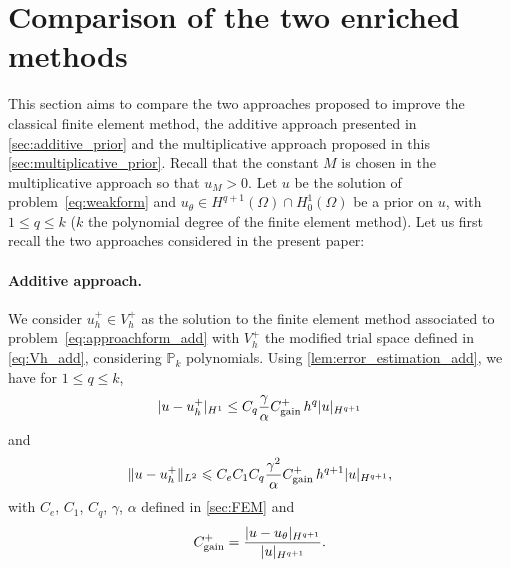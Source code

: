 \section{Comparison of the two enriched methods}
\label{sec:comparison_add_mul}

This section aims to compare the two approaches proposed to improve the classical finite element method, the additive approach presented in \cref{sec:additive_prior} and the multiplicative approach proposed in this \cref{sec:multiplicative_prior}. Recall that the constant $M$ is chosen in the multiplicative approach so that $u_M>0$.
Let $u$ be the solution of problem~\eqref{eq:weakform} and $u_{\theta}\in H^{q+1}(\Omega)\cap H^1_0(\Omega)$ be a prior on $u$, with $1\le q\le k$ ($k$ the polynomial degree of the finite element method). Let us first recall the two approaches considered in the present paper:

\paragraph*{Additive approach.} We consider $u_h^+\in V_h^+$ as the solution to the finite element method associated to problem~\eqref{eq:approachform_add} with $V_h^+$ the modified trial space defined in \eqref{eq:Vh_add}, considering $\mathbb{P}_k$ polynomials. Using \cref{lem:error_estimation_add}, we have for $1\le q\le k$,
\begin{equation}
	\label{eq:error_add_comp}
	| u-u_h^+|_{H^1} \leq C_q\dfrac{\gamma}{\alpha} C_\text{\rm gain}^+ \, h^{q} |u|_{H^{q+1}}
\end{equation}
and
\begin{equation}
    \label{eq:error_addL2_comp}
    \| u-u_h^+\|_{L^2} \leqslant C_e C_1 C_q\dfrac{\gamma^2}{\alpha} C_\text{\rm gain}^+ \, h^{q+1} |u|_{H^{q+1}},
\end{equation}
with $C_e$, $C_1$, $C_q$, $\gamma$, $\alpha$ defined in \cref{sec:FEM} and
\begin{equation}
	\label{eq:C_gain_add_in_comparison}
	C_\text{\rm gain}^+= \frac{| u-u_{\theta} |_{H^{q+1}}}{| u |_{H^{q+1}}}.
\end{equation}

